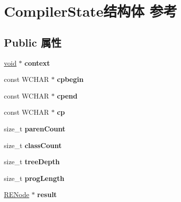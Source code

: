 \hypertarget{struct_compiler_state}{}\section{Compiler\+State结构体 参考}
\label{struct_compiler_state}
\subsection*{Public 属性}
\begin{DoxyCompactItemize}
\item 
\mbox{\label{struct_compiler_state_ad64b660027d83f82c96f445f18735ef8}} 
\hyperlink{interfacevoid}{void} $\ast$ {\bfseries context}
\item 
\mbox{\label{struct_compiler_state_af90d5cf560cfe7783272e6d9d77c62de}} 
const W\+C\+H\+AR $\ast$ {\bfseries cpbegin}
\item 
\mbox{\label{struct_compiler_state_a56b735df5d6fda77d32edc6955c54030}} 
const W\+C\+H\+AR $\ast$ {\bfseries cpend}
\item 
\mbox{\label{struct_compiler_state_a7941dc0300559a19698130e9e82847a0}} 
const W\+C\+H\+AR $\ast$ {\bfseries cp}
\item 
\mbox{\label{struct_compiler_state_a92eb9bf2ae34a5b67a8288e549ed464e}} 
size\+\_\+t {\bfseries paren\+Count}
\item 
\mbox{\label{struct_compiler_state_ad2abeeb7e63f9c75dbf514894d590d28}} 
size\+\_\+t {\bfseries class\+Count}
\item 
\mbox{\label{struct_compiler_state_a89596b3836e8848506479d8ee2dff00e}} 
size\+\_\+t {\bfseries tree\+Depth}
\item 
\mbox{\label{struct_compiler_state_af5af86ae0e0e6a6ac18412440789cea1}} 
size\+\_\+t {\bfseries prog\+Length}
\item 
\mbox{\label{struct_compiler_state_a2b9bc33be6d08cc84ceaab9d0d58a5ac}} 
\hyperlink{struct_r_e_node}{R\+E\+Node} $\ast$ {\bfseries result}

\end{DoxyCompactItemize}
